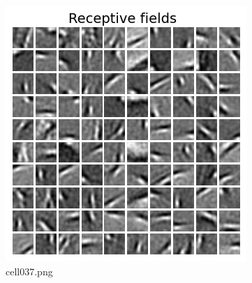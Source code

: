 \begin{figure}[ht]
	\centering
	\includegraphics[scale=0.8, max width=\linewidth]{./fig/energy-based-model/sparse-coding/cell037.png}
	\caption{cell037.png}
	\label{cell037.png}
\end{figure}